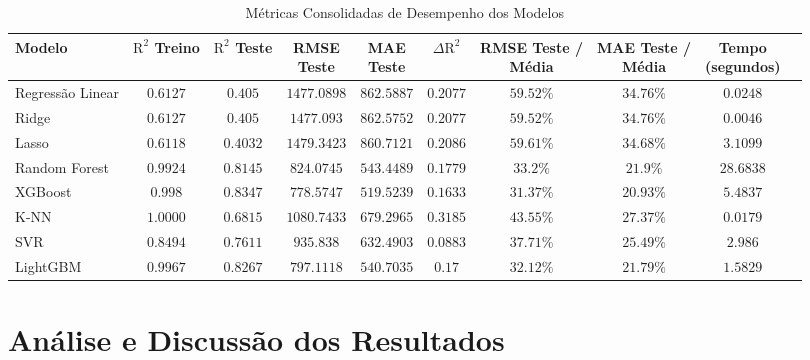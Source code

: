 \begin{table}[h!]
    \centering
    \captionsetup{justification=centering}
    \caption{Métricas Consolidadas de Desempenho dos Modelos}
    \label{tab:metricas_consolidadas_capitulo}
    \small 
    \setlength{\tabcolsep}{3pt} %
    \begin{adjustbox}{max width=\textwidth}
    \begin{tabular}{p{3.5cm}ccccccccc} 
        \toprule
        Modelo & \makecell{$\text{R}^2$ \\ Treino} & $\text{R}^2$ \textbf{Teste} & \makecell{RMSE \\ Teste} & \makecell{MAE \\ Teste} & $\Delta \text{R}^2$ & \makecell{RMSE Teste / \\ Média} & \makecell{MAE Teste / \\ Média} & \makecell{Tempo \\ (segundos)} \\
        \midrule
        Regressão Linear & $0.6127$ & $0.405$ & $1477.0898$ & $862.5887$ & $0.2077$ & $59.52\%$ & $34.76\%$ & $0.0248$ \\
        Ridge & $0.6127$ & $0.405$ & $1477.093$ & $862.5752$ & $0.2077$ & $59.52\%$ & $34.76\%$ & $0.0046$ \\
        Lasso & $0.6118$ & $0.4032$ & $1479.3423$ & $860.7121$ & $0.2086$ & $59.61\%$ & $34.68\%$ & $3.1099$ \\
        \midrule
        Random Forest & $0.9924$ & $0.8145$ & $824.0745$ & $543.4489$ & $0.1779$ & $33.2\%$ & $21.9\%$ & $28.6838$ \\
        XGBoost & $0.998$ & $0.8347$ & $778.5747$ & $519.5239$ & $0.1633$ & $31.37\%$ & $20.93\%$ & $5.4837$ \\
        K-NN & $1.0000$ & $0.6815$ & $1080.7433$ & $679.2965$ & $0.3185$ & $43.55\%$ & $27.37\%$ & $0.0179$ \\
        SVR & $0.8494$ & $0.7611$ & $935.838$ & $632.4903$ & $0.0883$ & $37.71\%$ & $25.49\%$ & $2.986$ \\
        LightGBM & $0.9967$ & $0.8267$ & $797.1118$ & $540.7035$ & $0.17$ & $32.12\%$ & $21.79\%$ & $1.5829$ \\
        \bottomrule
    \end{tabular}
    \end{adjustbox}
\end{table}

\section{Análise e Discussão dos Resultados}

